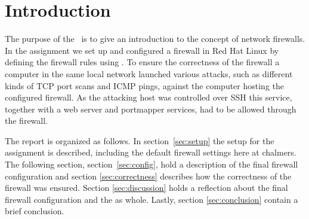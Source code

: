 \section{Introduction} 
\label{sec:intro}

The purpose of the \lab~is to give an introduction to the concept of network firewalls. In the assignment we set up and configured a firewall in Red Hat Linux by defining the firewall rules using . To ensure the correctness of the firewall a computer in the same local network launched various attacks, such as different kinds of TCP port scans and ICMP pings, against the computer hosting the configured firewall. As the attacking host was controlled over SSH this service, together with a web server and portmapper services, had to be allowed through the firewall. 

The report is organized as follows. In section~\ref{sec:setup} the setup for the assignment is described, including the default firewall settings here at chalmers. The following section, section~\ref{sec:config}, hold a description of the final firewall configuration and section \ref{sec:correctness} describes how the correctness of the firewall was ensured. Section \ref{sec:discussion} holds a reflection about the final firewall configuration and the \lab as whole. Lastly, section \ref{sec:conclusion} contain a brief conclusion.